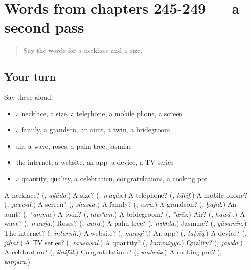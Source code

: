 \section[(dialogue)]{Words from chapters 245-249 — a second pass}

\label{lesson:AR-R249-second-pass-words-from-chapters-245-249}



\begin{quote}
Say the words for a necklace and a size.
\end{quote}

\subsection*{Your turn}
Say these aloud:

\begin{itemize}
\raggedright
  \item a necklace, a size, a telephone, a mobile phone, a screen
  \item a family, a grandson, an aunt, a twin, a bridegroom
  \item air, a wave, roses, a palm tree, jasmine
  \item the internet, a website, an app, a device, a TV series
  \item a quantity, quality, a celebration, congratulations, a cooking pot
\end{itemize}

\begin{tcolorbox}[breakable,colback=teal!4,colframe=teal!35!black,title={Before you move on}]
A necklace? (\textbf{}, \emph{qilāda}.) A size? (\textbf{}, \emph{maqās}.) A telephone? (\textbf{}, \emph{hātif}.) A mobile phone? (\textbf{}, \emph{jawwāl}.) A screen? (\textbf{}, \emph{shāsha}.) A family? (\textbf{}, \emph{usra}.) A grandson? (\textbf{}, \emph{ḥafīd}.) An aunt? (\textbf{}, \emph{ʿamma}.) A twin? (\textbf{}, \emph{tawʾam}.) A bridegroom? (\textbf{}, \emph{ʿarīs}.) Air? (\textbf{}, \emph{hawāʾ}.) A wave? (\textbf{}, \emph{mawja}.) Roses? (\textbf{}, \emph{ward}.) A palm tree? (\textbf{}, \emph{nakhla}.) Jasmine? (\textbf{}, \emph{yāsamīn}.) The internet? (\textbf{}, \emph{intarnit}.) A website? (\textbf{}, \emph{mawqiʿ}.) An app? (\textbf{}, \emph{taṭbīq}.) A device? (\textbf{}, \emph{jihāz}.) A TV series? (\textbf{}, \emph{musalsal}.) A quantity? (\textbf{}, \emph{kammiyya}.) Quality? (\textbf{}, \emph{jawda}.) A celebration? (\textbf{}, \emph{iḥtifāl}.) Congratulations? (\textbf{}, \emph{mabrūk}.) A cooking pot? (\textbf{}, \emph{ṭanjara}.)
\end{tcolorbox}
